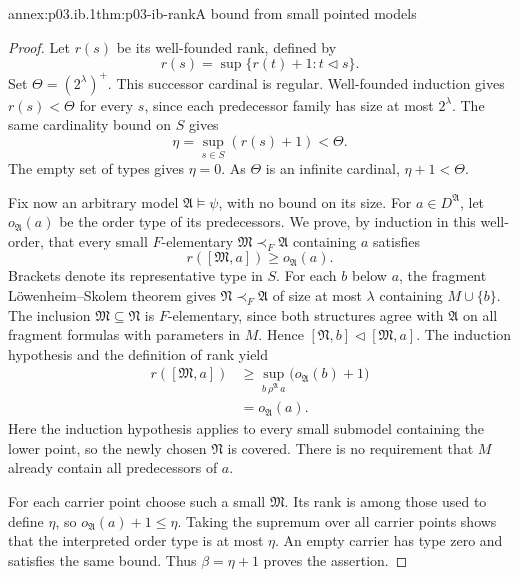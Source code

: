 \begin{annexitem}{annex:p03.ib.1}{thm:p03-ib-rank}{A bound from small pointed models}
\begin{proof}
Let \(r(s)\) be its well-founded rank, defined by
\[
 r(s)=\sup\{r(t)+1:t\triangleleft s\}.
\]
Set \(\Theta=(2^\lambda)^+\). This successor cardinal is regular.
Well-founded induction gives \(r(s)<\Theta\) for every \(s\),
since each predecessor family has size at most \(2^\lambda\).
The same cardinality bound on \(S\) gives
\[
 \eta=\sup_{s\in S}(r(s)+1)<\Theta.
\]
The empty set of types gives \(\eta=0\). As \(\Theta\) is an
infinite cardinal, \(\eta+1<\Theta\).

Fix now an arbitrary model \(\mathfrak A\models\psi\), with
no bound on its size. For \(a\in D^{\mathfrak A}\), let
\(o_{\mathfrak A}(a)\) be the order type of its predecessors.
We prove, by induction in this well-order, that every small
\(F\)-elementary \(\mathfrak M\prec_F\mathfrak A\) containing
\(a\) satisfies
\[
 r([\mathfrak M,a])\geq o_{\mathfrak A}(a).
\]
Brackets denote its representative type in \(S\).
For each \(b\) below \(a\), the fragment L\"owenheim--Skolem
theorem gives \(\mathfrak N\prec_F\mathfrak A\) of size at most
\(\lambda\) containing \(M\cup\{b\}\).
The inclusion \(\mathfrak M\subseteq\mathfrak N\) is
\(F\)-elementary, since both structures agree with
\(\mathfrak A\) on all fragment formulas with parameters in
\(M\). Hence
\([\mathfrak N,b]\triangleleft[\mathfrak M,a]\).
The induction hypothesis and the definition of rank yield
\[
\begin{aligned}
 r([\mathfrak M,a])
   &\geq\sup_{b\,\rho^{\mathfrak A}\,a}
                     \bigl(o_{\mathfrak A}(b)+1\bigr)\\
   &=o_{\mathfrak A}(a).
\end{aligned}
\]
Here the induction hypothesis applies to every small submodel
containing the lower point, so the newly chosen \(\mathfrak N\)
is covered. There is no requirement that \(M\) already contain
all predecessors of \(a\).

For each carrier point choose such a small \(\mathfrak M\).
Its rank is among those used to define \(\eta\), so
\(o_{\mathfrak A}(a)+1\leq\eta\). Taking the supremum over
all carrier points shows that the interpreted order type is at
most \(\eta\). An empty carrier has type zero and satisfies
the same bound. Thus \(\beta=\eta+1\) proves the assertion.
\end{proof}
\end{annexitem}

